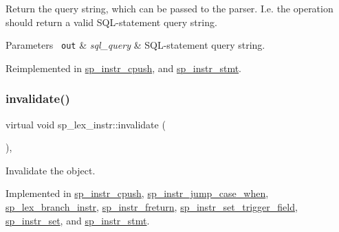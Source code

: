 Return the query string, which can be passed to the parser. I.\+e. the operation should return a valid S\+QL-\/statement query string.


\begin{DoxyParams}[1]{Parameters}
\mbox{\texttt{ out}}  & {\em sql\+\_\+query} & S\+QL-\/statement query string. \\
\hline
\end{DoxyParams}


Reimplemented in \mbox{\hyperlink{classsp__instr__cpush_acdfc630a526f268fa2b983fe55fc0982}{sp\+\_\+instr\+\_\+cpush}}, and \mbox{\hyperlink{classsp__instr__stmt_a271adfe3156abe2c56cb3b65f9265eb9}{sp\+\_\+instr\+\_\+stmt}}.

\mbox{\label{classsp__lex__instr_ae9945d69ab5d91d6ce215f194beea882}} 
\subsubsection{\texorpdfstring{invalidate()}{invalidate()}}
{\footnotesize\ttfamily virtual void sp\+\_\+lex\+\_\+instr\+::invalidate (\begin{DoxyParamCaption}{ }\end{DoxyParamCaption})\hspace{0.3cm}{\ttfamily [protected]}, {}}

Invalidate the object. 

Implemented in \mbox{\hyperlink{classsp__instr__cpush_a0bbf836e06e7be8c7f1fbcfba702d43c}{sp\+\_\+instr\+\_\+cpush}}, \mbox{\hyperlink{classsp__instr__jump__case__when_a35195c6200f0d6e87bde67b83f5fd767}{sp\+\_\+instr\+\_\+jump\+\_\+case\+\_\+when}}, \mbox{\hyperlink{classsp__lex__branch__instr_a91d747da2e1068e2d6ac0fd7c06a4018}{sp\+\_\+lex\+\_\+branch\+\_\+instr}}, \mbox{\hyperlink{classsp__instr__freturn_a02bf622965c9cdbe481ce87a3e1051cf}{sp\+\_\+instr\+\_\+freturn}}, \mbox{\hyperlink{classsp__instr__set__trigger__field_ab90045ba709dccc47878abc712db679f}{sp\+\_\+instr\+\_\+set\+\_\+trigger\+\_\+field}}, \mbox{\hyperlink{classsp__instr__set_a4c871b1b9db55d27231d512a8eef9285}{sp\+\_\+instr\+\_\+set}}, and \mbox{\hyperlink{classsp__instr__stmt_a15924975452f322b5d8216b3b8279988}{sp\+\_\+instr\+\_\+stmt}}.

\mbox{\label{classsp__lex__instr_a56788cb475ccf94f224816006d9c90e9}} 
